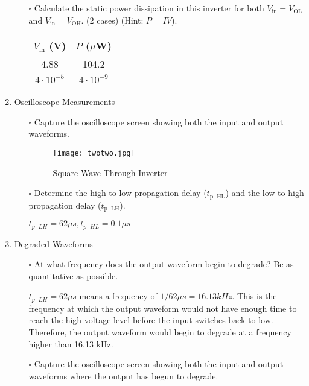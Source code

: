 \documentclass[12pt]{article}
\begin{document}
\begin{enumerate}
\begin{itemize}
    
    \item[$\square$] Calculate the static power dissipation in this inverter for both $V_\mathrm{in} = V_\mathrm{OL}$ and $V_\mathrm{in} = V_\mathrm{OH}$. (2 cases) (Hint: $P = IV$).

\begin{tabular}{|c|c|}
\hline
$V_\mathrm{in}$ (V) & $P$ ($\mu$W) \\
\hline
4.88 & 104.2 \\
$4\cdot 10^{-5}$ & $4\cdot 10^{-9}$ \\
\hline
\end{tabular}

    
\end{itemize}
\item Oscilloscope Measurements
\begin{itemize}
    \item[$\square$] Capture the oscilloscope screen showing both the input and output waveforms.

\begin{figure}[h]
    \centering
    \texttt{[image: twotwo.jpg]}
    \caption{Square Wave Through Inverter}
    \label{fig:Square-Wave-Inverter}
\end{figure}

    \item[$\square$] Determine the high-to-low propagation delay ($t_\mathrm{p\cdot HL}$) and the low-to-high propagation delay ($t_\mathrm{p\cdot LH}$).

    $t_{p\cdot LH} = 62 \mu s, t_{p\cdot HL} = 0.1 \mu s$

    
\end{itemize}
\item Degraded Waveforms
\begin{itemize}
    \item[$\square$] At what frequency does the output waveform begin to degrade? Be as quantitative as possible.

    $t_{p\cdot LH} = 62 \mu s$ means a frequency of $1/62\mu s = 16.13 kHz$. 
    This is the frequency at which the output waveform would not have enough time to reach the high voltage level before the input switches back to low.
    Therefore, the output waveform would begin to degrade at a frequency higher than 16.13 kHz.
    
    \item[$\square$] Capture the oscilloscope screen showing both the input and output waveforms where the output has begun to degrade.


\end{itemize}
\end{enumerate}
\end{document}
